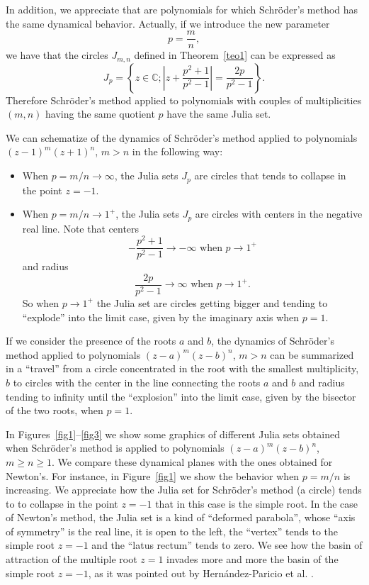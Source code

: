 \documentclass[10pt,a4paper]{article}
\begin{document}
In addition, we appreciate that are polynomials for which Schr\"oder's method  has the same dynamical behavior. Actually, if we introduce the new parameter
$$
p=\frac{m}{n},
$$
we have that the circles $J_{m,n}$ defined in Theorem~\ref{teo1} can be expressed as
$$J_{p}=\left\{z\in\mathbb{C}; \left|z+\frac{p^2+1}{p^2-1}\right|=\frac{2p}{p^2-1}\right\}.$$
Therefore Schr\"oder's method applied to polynomials with couples of multiplicities $(m,n)$ having the same quotient $p$ have the same Julia set.

We can schematize of the dynamics of Schr\"oder's method applied to polynomials $(z-1)^m(z+1)^n$, $m>n$ in the following way:
\begin{itemize}
\item When $p=m/n\to \infty$, the Julia sets $J_p$ are circles that tends to collapse in the point $z=-1$.
\item When $p=m/n\to 1^+$, the Julia sets $J_p$ are circles with centers in the negative real line. Note
that centers
$$
-\frac{p^2+1}{p^2-1}\to -\infty \text{ when } p\to 1^+
$$
and radius
$$
\frac{2p}{p^2-1}\to \infty \text{ when } p\to 1^+.
$$
So when $p\to 1^+$ the Julia set are circles getting bigger and tending to ``explode'' into the limit case, given by the imaginary axis when $p=1$.
\end{itemize}

If we consider the presence of the roots $a$ and $b$, the dynamics of Schr\"oder's method applied to polynomials $(z-a)^m(z-b)^n$, $m>n$ can be summarized in a ``travel'' from a circle concentrated in the root with the smallest multiplicity, $b$ to circles with the center in the line connecting the roots $a$ and $b$ and radius tending to infinity until the ``explosion'' into the limit case, given by the bisector of the two roots,  when $p=1$.

In Figures~\ref{fig1}--\ref{fig3} we show some graphics of different Julia sets obtained when Schr\"oder's method is applied to polynomials $(z-a)^m(z-b)^n$, $m\ge n\ge 1$. We compare these dynamical planes with the ones obtained for Newton's.   For instance, in Figure~\ref{fig1} we show the behavior when $p=m/n$ is increasing. We appreciate how the Julia set for Schr\"oder's method (a circle) tends to to collapse in the point $z=-1$  that in this case is the simple root. In the case of Newton's method, the Julia set is a kind of ``deformed parabola'', whose ``axis of symmetry''  is the real line, it is open to the left, the ``vertex'' tends to the simple root $z=-1$ and the ``latus rectum''  tends to zero. We see how the basin of attraction of the multiple root $z=1$ invades more and more the basin of the simple root $z=-1$, as it was pointed out by Hern\'andez-Paricio et al. \cite{Gut}.
\end{document}
